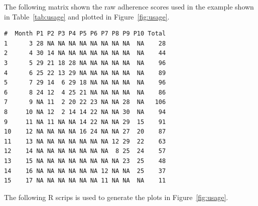 The following matrix shown the raw adherence scores used in the example shown in Table~\ref{tab:usage} and plotted in Figure~\ref{fig:usage}.

\begin{verbatim}
#  Month P1 P2 P3 P4 P5 P6 P7 P8 P9 P10 Total
1      3 28 NA NA NA NA NA NA NA NA  NA    28
2      4 30 14 NA NA NA NA NA NA NA  NA    44
3      5 29 21 18 28 NA NA NA NA NA  NA    96
4      6 25 22 13 29 NA NA NA NA NA  NA    89
5      7 29 14  6 29 18 NA NA NA NA  NA    96
6      8 24 12  4 25 21 NA NA NA NA  NA    86
7      9 NA 11  2 20 22 23 NA NA 28  NA   106
8     10 NA 12  2 14 14 22 NA NA 30  NA    94
9     11 NA 11 NA NA 14 22 NA NA 29  15    91
10    12 NA NA NA NA 16 24 NA NA 27  20    87
11    13 NA NA NA NA NA NA NA 12 29  22    63
12    14 NA NA NA NA NA NA NA  8 25  24    57
13    15 NA NA NA NA NA NA NA NA 23  25    48
14    16 NA NA NA NA NA NA 12 NA NA  25    37
15    17 NA NA NA NA NA NA 11 NA NA  NA    11
\end{verbatim}

\noindent The following R scrips is used to generate the plots in  Figure~\ref{fig:usage}.


